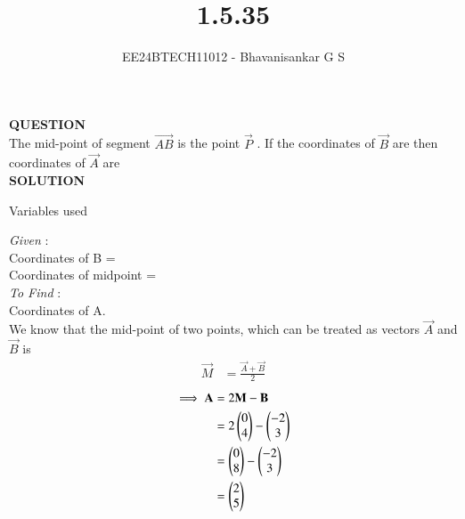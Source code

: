 \documentclass[journal]{IEEEtran}
\begin{document}

\vspace{3cm}

\title{1.5.35}
\author{EE24BTECH11012 - Bhavanisankar G S}
{\let\newpage\relax\maketitle}

\renewcommand{\thefigure}{\theenumi}
\renewcommand{\thetable}{\theenumi}
\setlength{\intextsep}{10pt} %


\renewcommand{\thetable}{\theenumi}

\textbf{QUESTION} \\
The mid-point of segment $\vec{AB}$ is the point $\vec{P}$  . If the coordinates of $\vec{B}$ are  then coordinates of $\vec{A}$ are \hfill {} \\
\textbf{SOLUTION} \\
\begin{table}[h!]    
  \centering
  
	\caption{Variables used}
  \label{tab.1.5.35}
\end{table}
\emph{Given} : \\
Coordinates of B =  \\
Coordinates of midpoint   =  \\
\emph{To Find} : \\
Coordinates of A. \\
We know that the mid-point of two points, which can be treated as vectors $\vec{A}$ and $\vec{B}$ is 
\begin{equation}
	\label{eq1}
	\begin{split}
	 \vec{M} &= \frac{\vec{A} + \vec{B}}{2} 
	\end{split}
\end{equation}
\begin{equation}
	\begin{split}
		\implies \mathbf{A} &= 2\mathbf{M} - \mathbf{B} \\
 &= 2\begin{pmatrix} 0 \\ 4 \end{pmatrix} - \begin{pmatrix}-2 \\ 3 \end{pmatrix} \\
 &= \begin{pmatrix}0 \\ 8\end{pmatrix} - \begin{pmatrix}-2 \\ 3\end{pmatrix} \\
		&= \begin{pmatrix}2 \\ 5\end{pmatrix} 
	\end{split}
\end{equation}
\end{document}
